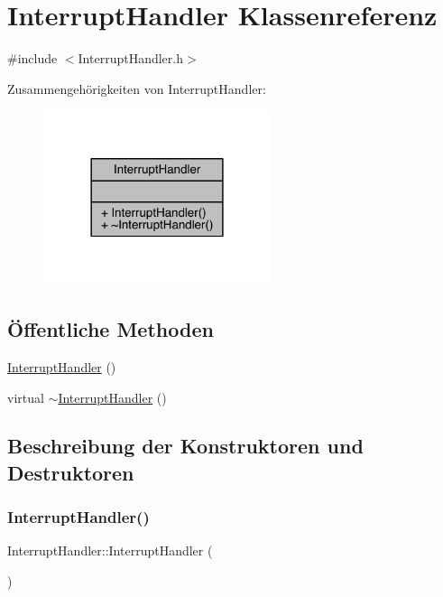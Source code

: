 \hypertarget{class_interrupt_handler}{}\section{Interrupt\+Handler Klassenreferenz}
\label{class_interrupt_handler}


{\ttfamily \#include $<$Interrupt\+Handler.\+h$>$}



Zusammengehörigkeiten von Interrupt\+Handler\+:
\nopagebreak
\begin{figure}[H]
\begin{center}
\leavevmode
\includegraphics[width=189pt]{class_interrupt_handler__coll__graph}
\end{center}
\end{figure}
\subsection*{Öffentliche Methoden}
\begin{DoxyCompactItemize}
\item 
\hyperlink{class_interrupt_handler_a2fe85721d474d4cea46f7e2b6f10aae3}{Interrupt\+Handler} ()
\item 
virtual \hyperlink{class_interrupt_handler_a12b87c89015a61b702184070354e7876}{$\sim$\+Interrupt\+Handler} ()
\end{DoxyCompactItemize}


\subsection{Beschreibung der Konstruktoren und Destruktoren}
\hypertarget{class_interrupt_handler_a2fe85721d474d4cea46f7e2b6f10aae3}{}\label{class_interrupt_handler_a2fe85721d474d4cea46f7e2b6f10aae3} 
\subsubsection{\texorpdfstring{Interrupt\+Handler()}{InterruptHandler()}}
{\footnotesize\ttfamily Interrupt\+Handler\+::\+Interrupt\+Handler (\begin{DoxyParamCaption}{ }\end{DoxyParamCaption})}

